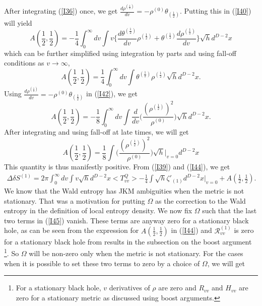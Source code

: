 \documentclass[12pt]{article}
\begin{document}
After integrating (\ref{I36}) once, we get $\frac{d\rho^{(\frac{1}{2})}}{dv}=-\rho^{(0)} \theta_{(\frac{1}{2})}$.  Putting this in (\ref{I40}) will yield
\begin{equation}\label{I41}
A(\frac{1}{2},\frac{1}{2}) = -\frac{1}{4}\int_{0}^{\infty}dv \int v \Big\{\frac{d\theta^{(\frac{1}{2})}}{dv} \rho^{(\frac{1}{2})} +  \theta^{(\frac{1}{2})} \frac{d\rho^{(\frac{1}{2})}}{dv}  \Big\} \sqrt{h} d^{D-2}x
\end{equation}
which can be further simplified using integration by parts and using fall-off conditions as $v \to \infty$,
\begin{equation}\label{I42}
A(\frac{1}{2},\frac{1}{2}) = \frac{1}{4}\int_{0}^{\infty}dv \int \theta^{(\frac{1}{2})} \rho^{(\frac{1}{2})} \sqrt{h} d^{D-2}x .
\end{equation}
Using $\frac{d\rho^{(\frac{1}{2})}}{dv}=-\rho^{(0)} \theta_{(\frac{1}{2})}$ in (\ref{I42}), we get
\begin{equation}\label{I43}
A(\frac{1}{2},\frac{1}{2}) = -\frac{1}{8}\int_{0}^{\infty}dv \int  \frac{d}{dv} \Big(\frac{(\rho^{(\frac{1}{2})})^2}{\rho^{(0)}}\Big) \sqrt{h} d^{D-2}x.
\end{equation}
After integrating and using fall-off at late times, we will get
\begin{equation}\label{I44}
A(\frac{1}{2},\frac{1}{2}) = \frac{1}{8} \int  \Big(\frac{(\rho^{(\frac{1}{2})})^2}{\rho^{(0)}}\Big) \sqrt{h} \Big|_{v=0} d^{D-2}x
\end{equation}
This quantity is thus manifestly positive. From (\ref{I39}) and (\ref{I44}),  we get
\begin{multline}\label{I45}
\Delta \delta S^{(1)}= 2\pi\int_{0}^{\infty}dv \int v \sqrt{h} d^{D-2}x   <T^{Q}_{vv}>
- \frac{1}{4} \int \sqrt{h} \zeta'_{(1)} d^{D-2}x \Big|_{v=0}  + A(\frac{1}{2},\frac{1}{2}).
\end{multline}
We know that the Wald entropy has JKM ambiguities when the metric is not stationary. That was a motivation for putting $\Omega$  as the correction to the Wald entropy in the definition of local entropy density. We now fix $\Omega$ such that the last two terms in (\ref{I45}) vanish. These terms are anyway zero for a stationary black hole, as can be seen from the expression for $A(\frac{1}{2},\frac{1}{2})$ in (\ref{I44}) and $\mathcal{R}^{(1)}_{vv}$ is zero for a stationary black hole from results in the subsection on the boost argument \footnote{For a stationary black hole, $v$ derivatives of $\rho$ are zero and $R_{vv}$ and $H_{vv}$ are zero for a stationary metric as discussed using boost arguments.}. So $\Omega$ will be non-zero only when the metric is not stationary. For the cases when it is possible to set these two terms to zero by a choice of $\Omega$, we will get
\end{document}
